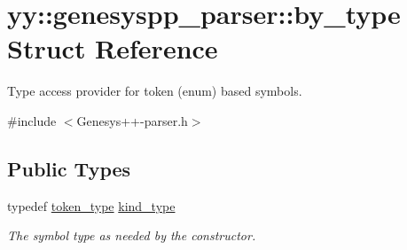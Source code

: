 \hypertarget{structyy_1_1genesyspp__parser_1_1by__type}{\section{yy\-:\-:genesyspp\-\_\-parser\-:\-:by\-\_\-type Struct Reference}
\label{structyy_1_1genesyspp__parser_1_1by__type}
}


Type access provider for token (enum) based symbols.  




{\ttfamily \#include $<$Genesys++-\/parser.\-h$>$}

\subsection*{Public Types}
\begin{DoxyCompactItemize}
\item 
typedef \hyperlink{structyy_1_1genesyspp__parser_1_1token_a473652e1e69da7c38a16e5d2aaac94b9}{token\-\_\-type} \hyperlink{structyy_1_1genesyspp__parser_1_1by__type_a7a616822e1a3b0a196ab34118104c384}{kind\-\_\-type}
\begin{DoxyCompactList}\small\item\em The symbol type as needed by the constructor. \end{DoxyCompactList}\end{DoxyCompactItemize}
